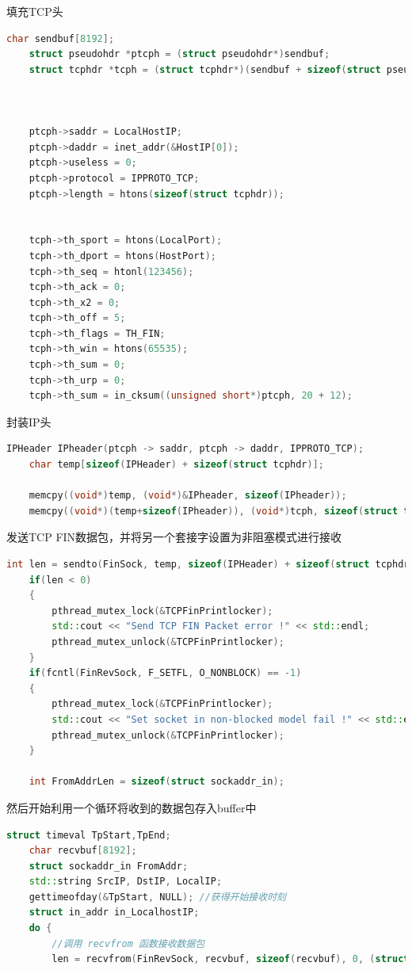 \documentclass[UTF8,a4paper,10pt]{ctexart}
\begin{document}
填充TCP头
\begin{lstlisting}[language = C++]
    char sendbuf[8192];
    struct pseudohdr *ptcph = (struct pseudohdr*)sendbuf; 
    struct tcphdr *tcph = (struct tcphdr*)(sendbuf + sizeof(struct pseudohdr)); 

    
    
	ptcph->saddr = LocalHostIP; 
    ptcph->daddr = inet_addr(&HostIP[0]); 
    ptcph->useless = 0; 
    ptcph->protocol = IPPROTO_TCP; 
    ptcph->length = htons(sizeof(struct tcphdr));


    tcph->th_sport = htons(LocalPort);  
    tcph->th_dport = htons(HostPort); 
    tcph->th_seq = htonl(123456); 
    tcph->th_ack = 0; 
    tcph->th_x2 = 0; 
    tcph->th_off = 5; 
    tcph->th_flags = TH_FIN; 
    tcph->th_win = htons(65535); 
    tcph->th_sum = 0; 
    tcph->th_urp = 0; 
	tcph->th_sum = in_cksum((unsigned short*)ptcph, 20 + 12);
\end{lstlisting}
封装IP头
\begin{lstlisting}[language = C++]
    IPHeader IPheader(ptcph -> saddr, ptcph -> daddr, IPPROTO_TCP);
	char temp[sizeof(IPHeader) + sizeof(struct tcphdr)];

	memcpy((void*)temp, (void*)&IPheader, sizeof(IPheader));
	memcpy((void*)(temp+sizeof(IPheader)), (void*)tcph, sizeof(struct tcphdr));
\end{lstlisting}
发送TCP FIN数据包，并将另一个套接字设置为非阻塞模式进行接收
\begin{lstlisting}[language = C++]
    int len = sendto(FinSock, temp, sizeof(IPHeader) + sizeof(struct tcphdr), 0, (struct sockaddr *)&FINScanHostAddr, sizeof(FINScanHostAddr)); 
	if(len < 0) 
	{
		pthread_mutex_lock(&TCPFinPrintlocker);
		std::cout << "Send TCP FIN Packet error !" << std::endl;
		pthread_mutex_unlock(&TCPFinPrintlocker);		
	} 
    if(fcntl(FinRevSock, F_SETFL, O_NONBLOCK) == -1) 
	{
		pthread_mutex_lock(&TCPFinPrintlocker);
        std::cout << "Set socket in non-blocked model fail !" << std::endl;
		pthread_mutex_unlock(&TCPFinPrintlocker);
	}

    int FromAddrLen = sizeof(struct sockaddr_in);
\end{lstlisting}
然后开始利用一个循环将收到的数据包存入buffer中
\begin{lstlisting}[language = C++]
    struct timeval TpStart,TpEnd; 
    char recvbuf[8192];
    struct sockaddr_in FromAddr;
    std::string SrcIP, DstIP, LocalIP;
    gettimeofday(&TpStart, NULL); //获得开始接收时刻 
    struct in_addr in_LocalhostIP;
    do {
        //调用 recvfrom 函数接收数据包
        len = recvfrom(FinRevSock, recvbuf, sizeof(recvbuf), 0, (struct sockaddr*) &FromAddr, (socklen_t*) &FromAddrLen);
\end{lstlisting}
\end{document}
